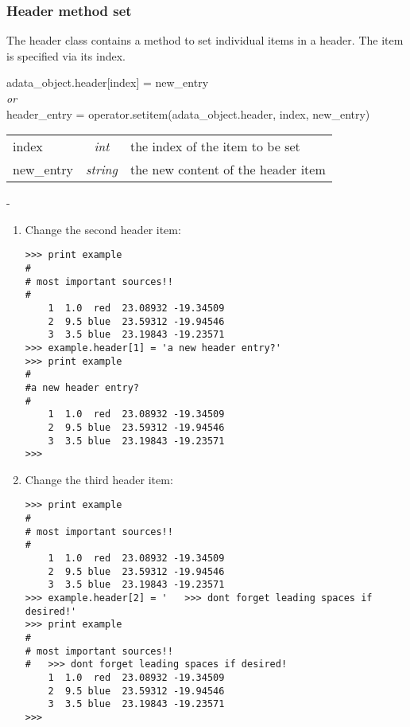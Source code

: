 \subsubsection{Header method set}
\label{ahe_set}
%
The header class contains a method to set individual items in a header.
The item is specified via its index.

adata\_object.header[index] = new\_entry\\
{\it or}\\
header\_entry = operator.setitem(adata\_object.header, index, new\_entry)

\begin{tabular}{lcl}
index &{\it int}& the index of the item to be set\\
new\_entry &{\it string}& the new content of the header item\\
\end{tabular}

-

\begin{enumerate}
\item Change the second header item:
\begin{small}
\begin{verbatim}
>>> print example
#
# most important sources!!
#
    1  1.0  red  23.08932 -19.34509
    2  9.5 blue  23.59312 -19.94546
    3  3.5 blue  23.19843 -19.23571
>>> example.header[1] = 'a new header entry?'
>>> print example
#
#a new header entry?
#
    1  1.0  red  23.08932 -19.34509
    2  9.5 blue  23.59312 -19.94546
    3  3.5 blue  23.19843 -19.23571
>>>
\end{verbatim}
\end{small}
\item Change the third header item:
\begin{small}
\begin{verbatim}
>>> print example
#
# most important sources!!
#
    1  1.0  red  23.08932 -19.34509
    2  9.5 blue  23.59312 -19.94546
    3  3.5 blue  23.19843 -19.23571
>>> example.header[2] = '   >>> dont forget leading spaces if desired!'
>>> print example
#
# most important sources!!
#   >>> dont forget leading spaces if desired!
    1  1.0  red  23.08932 -19.34509
    2  9.5 blue  23.59312 -19.94546
    3  3.5 blue  23.19843 -19.23571
>>>
\end{verbatim}
\end{small}
\end{enumerate}


